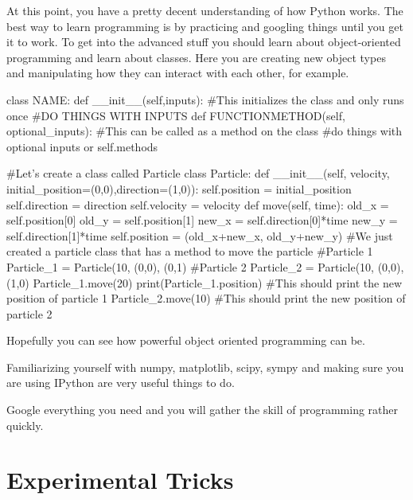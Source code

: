 \documentclass{article}
\begin{document}
At this point, you have a pretty decent understanding of how Python works. The best way to learn programming is by practicing and googling things until you get it to work.
To get into the advanced stuff you should learn about object-oriented programming and learn about classes. Here you are creating new object types and manipulating how they can interact with each other, for example.
\begin{python}
class NAME:
    def __init__(self,inputs): #This initializes the class and only runs once
        #DO THINGS WITH INPUTS
    def FUNCTIONMETHOD(self, optional_inputs): #This can be called as a method on the class
        #do things with optional inputs or self.methods
        
#Let's create a class called Particle
class Particle:
    def __init__(self, velocity, initial_position=(0,0),direction=(1,0)):
        self.position = initial_position
        self.direction = direction
        self.velocity = velocity
    def move(self, time):
        old_x = self.position[0]
        old_y = self.position[1]
        new_x = self.direction[0]*time
        new_y = self.direction[1]*time
        self.position = (old_x+new_x, old_y+new_y)
#We just created a particle class that has a method to move the particle
#Particle 1
Particle_1 = Particle(10, (0,0), (0,1)
#Particle 2
Particle_2 = Particle(10, (0,0), (1,0)
Particle_1.move(20)
print(Particle_1.position) #This should print the new position of particle 1
Particle_2.move(10) #This should print the new position of particle 2
\end{python}

Hopefully you can see how powerful object oriented programming can be.

Familiarizing yourself with numpy, matplotlib, scipy, sympy and making sure you are using IPython are very useful things to do.

Google everything you need and you will gather the skill of programming rather quickly.

\newpage
\section{Experimental Tricks}
\end{document}
